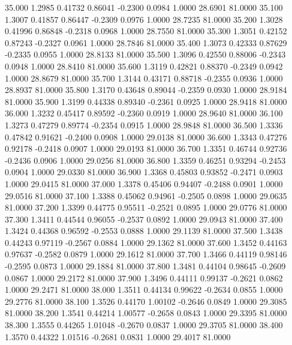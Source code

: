   35.000   1.2985   0.41732   0.86041  -0.2300   0.0984   1.0000  28.6901  81.0000
  35.100   1.3007   0.41857   0.86447  -0.2309   0.0976   1.0000  28.7235  81.0000
  35.200   1.3028   0.41996   0.86848  -0.2318   0.0968   1.0000  28.7550  81.0000
  35.300   1.3051   0.42152   0.87243  -0.2327   0.0961   1.0000  28.7846  81.0000
  35.400   1.3073   0.42333   0.87629  -0.2335   0.0955   1.0000  28.8133  81.0000
  35.500   1.3096   0.42550   0.88006  -0.2343   0.0948   1.0000  28.8410  81.0000
  35.600   1.3119   0.42821   0.88370  -0.2349   0.0942   1.0000  28.8679  81.0000
  35.700   1.3144   0.43171   0.88718  -0.2355   0.0936   1.0000  28.8937  81.0000
  35.800   1.3170   0.43648   0.89044  -0.2359   0.0930   1.0000  28.9184  81.0000
  35.900   1.3199   0.44338   0.89340  -0.2361   0.0925   1.0000  28.9418  81.0000
  36.000   1.3232   0.45417   0.89592  -0.2360   0.0919   1.0000  28.9640  81.0000
  36.100   1.3273   0.47279   0.89774  -0.2354   0.0915   1.0000  28.9848  81.0000
  36.500   1.3336   0.47842   0.91621  -0.2400   0.0908   1.0000  29.0138  81.0000
  36.600   1.3343   0.47276   0.92178  -0.2418   0.0907   1.0000  29.0193  81.0000
  36.700   1.3351   0.46744   0.92736  -0.2436   0.0906   1.0000  29.0256  81.0000
  36.800   1.3359   0.46251   0.93294  -0.2453   0.0904   1.0000  29.0330  81.0000
  36.900   1.3368   0.45803   0.93852  -0.2471   0.0903   1.0000  29.0415  81.0000
  37.000   1.3378   0.45406   0.94407  -0.2488   0.0901   1.0000  29.0516  81.0000
  37.100   1.3388   0.45062   0.94961  -0.2505   0.0898   1.0000  29.0635  81.0000
  37.200   1.3399   0.44775   0.95511  -0.2521   0.0895   1.0000  29.0776  81.0000
  37.300   1.3411   0.44544   0.96055  -0.2537   0.0892   1.0000  29.0943  81.0000
  37.400   1.3424   0.44368   0.96592  -0.2553   0.0888   1.0000  29.1139  81.0000
  37.500   1.3438   0.44243   0.97119  -0.2567   0.0884   1.0000  29.1362  81.0000
  37.600   1.3452   0.44163   0.97637  -0.2582   0.0879   1.0000  29.1612  81.0000
  37.700   1.3466   0.44119   0.98146  -0.2595   0.0873   1.0000  29.1884  81.0000
  37.800   1.3481   0.44104   0.98645  -0.2609   0.0867   1.0000  29.2172  81.0000
  37.900   1.3496   0.44111   0.99137  -0.2621   0.0862   1.0000  29.2471  81.0000
  38.000   1.3511   0.44134   0.99622  -0.2634   0.0855   1.0000  29.2776  81.0000
  38.100   1.3526   0.44170   1.00102  -0.2646   0.0849   1.0000  29.3085  81.0000
  38.200   1.3541   0.44214   1.00577  -0.2658   0.0843   1.0000  29.3395  81.0000
  38.300   1.3555   0.44265   1.01048  -0.2670   0.0837   1.0000  29.3705  81.0000
  38.400   1.3570   0.44322   1.01516  -0.2681   0.0831   1.0000  29.4017  81.0000
